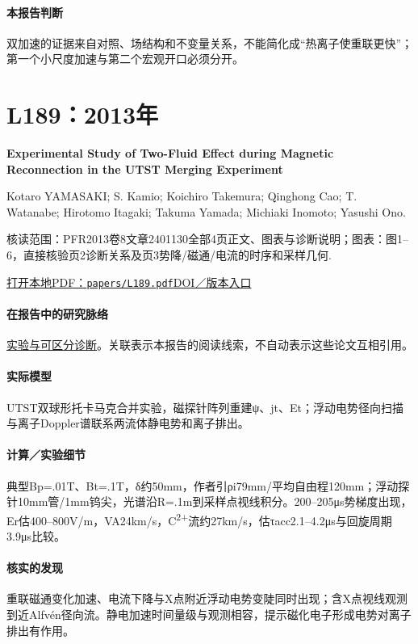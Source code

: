 \documentclass[UTF8,a4paper,11pt,openany,fontset=fandol]{ctexbook}
\begin{document}
\paragraph{本报告判断}双加速的证据来自对照、场结构和不变量关系，不能简化成“热离子使重联更快”；第一个小尺度加速与第二个宏观开口必须分开。

\section{L189：2013年}\label{paper:L189}

\textbf{Experimental Study of Two-Fluid Effect during Magnetic Reconnection in the UTST Merging Experiment}\citep{L189}\

Kotaro YAMASAKI;  S. Kamio;  Koichiro Takemura;  Qinghong Cao;  T. Watanabe;  Hirotomo Itagaki;  Takuma Yamada;  Michiaki Inomoto;  Yasushi Ono.

\textsf{核读范围：}PFR2013卷8文章2401130全部4页正文、图表与诊断说明；\textsf{图表：}图1–6，直接核验页2诊断关系及页3势降/磁通/电流的时序和采样几何.

\href{run:../papers/L189.pdf}{打开本地PDF：\texttt{papers/L189.pdf}}\quad\href{https://doi.org/10.1585/pfr.8.2401130}{DOI／版本入口}

\paragraph{在报告中的研究脉络}\hyperref[story:diagnostic]{实验与可区分诊断}。关联表示本报告的阅读线索，不自动表示这些论文互相引用。

\paragraph{实际模型}UTST双球形托卡马克合并实验，磁探针阵列重建ψ、jt、Et；浮动电势径向扫描与离子Doppler谱联系两流体静电势和离子排出。

\paragraph{计算／实验细节}典型Bp=.01T、Bt=.1T，δ约50mm，作者引ρi79mm/平均自由程120mm；浮动探针10mm管/1mm钨尖，光谱沿R=.1m到采样点视线积分。200–205μs势梯度出现，Er估400–800V/m，VA24km/s，C\textsuperscript{2+}流约27km/s，估τacc2.1–4.2μs与回旋周期3.9μs比较。

\paragraph{核实的发现}重联磁通变化加速、电流下降与X点附近浮动电势变陡同时出现；含X点视线观测到近Alfvén径向流。静电加速时间量级与观测相容，提示磁化电子形成电势对离子排出有作用。
\end{document}
